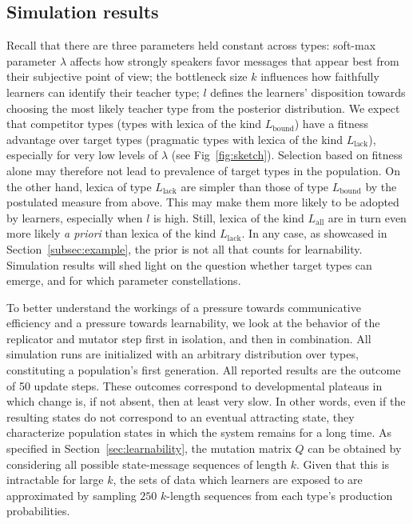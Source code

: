 \documentclass[a4paper, 11pt]{article}
\theoremstyle{Satz}
\newcommand{\mylang}[1]{\ensuremath{L_{\text{#1}}}\xspace} %
\newcommand{\Lall}{\mylang{all}}
\newcommand{\Lbound}{\mylang{bound}}
\newcommand{\Llack}{\mylang{lack}}
\begin{document}
\subsection{Simulation results}
\label{sec:simulation-results}
Recall that there are three parameters held constant across types: soft-max parameter $\lambda$ affects how strongly
speakers favor messages that appear best from their subjective point of view; the
bottleneck size $k$ influences how faithfully learners can identify their teacher type; $l$
defines the learners' disposition towards choosing the most likely teacher type from the
posterior distribution. We expect that competitor types (types with lexica of the kind
$\Lbound$) have a fitness advantage over target types (pragmatic types with lexica of the kind
$\Llack$), especially for very low levels of $\lambda$ (see Fig~\ref{fig:sketch}). Selection based on fitness alone may
therefore not lead to prevalence of target types in the population. On the other hand, lexica
of type $\Llack$ are simpler than those of type $\Lbound$ by the postulated measure from
above. This may make them more likely to be adopted by learners, especially when $l$ is high. Still, lexica of the kind $\Lall$ are in turn even more likely \emph{a priori} than lexica of the kind $\Llack$. In any case, as showcased in Section~\ref{subsec:example}, the prior is not all that counts for learnability. Simulation results will shed light on the question whether target
types can emerge, and for which parameter constellations.

To better understand the workings of a pressure towards communicative efficiency and a pressure
towards learnability, we look at the behavior of the replicator and mutator step first in
isolation, and then in combination. All simulation runs are initialized with an arbitrary
distribution over types, constituting a population's first generation. All reported results are
the outcome of 50 update steps. These outcomes correspond to developmental plateaus in which
change is, if not absent, then at least very slow. In other words, even if the resulting states
do not correspond to an eventual attracting state, they characterize population states in which the system remains for a long time. As specified in Section~\ref{sec:learnability}, the
mutation matrix $Q$ can be obtained by considering all possible state-message sequences of
length $k$. Given that this is intractable for large $k$, the sets of data which learners are
exposed to are approximated by sampling $250$ $k$-length sequences from each type's production
probabilities.
\end{document}

